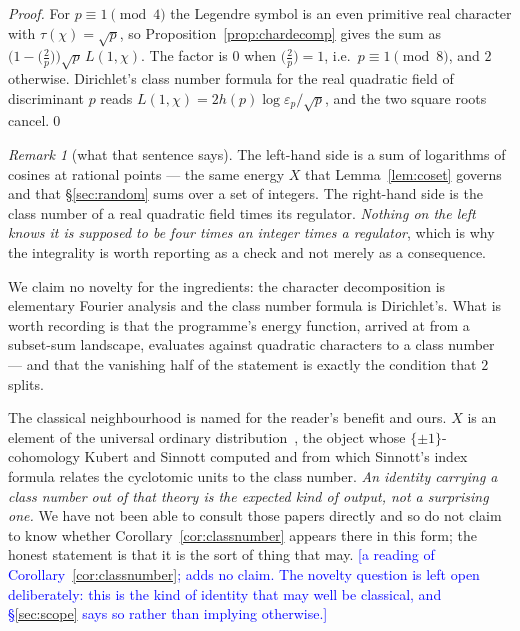 \documentclass[11pt,a4paper]{article}
\theoremstyle{plain}
\theoremstyle{definition}
\theoremstyle{remark}
\newtheorem{remark}[theorem]{Remark}
\newcommand{\STATUS}[1]{\textcolor{blue}{\textsf{[#1]}}}
\begin{document}
\begin{proof}
For $p\equiv1\pmod4$ the Legendre symbol is an even primitive real character with
$\tau(\chi)=\sqrt p$, so Proposition~\ref{prop:chardecomp} gives the sum as
$\bigl(1-\bigl(\tfrac2p\bigr)\bigr)\sqrt p\,L(1,\chi)$. The factor is $0$ when
$\bigl(\tfrac2p\bigr)=1$, i.e.\ $p\equiv1\pmod 8$, and $2$ otherwise. Dirichlet's class number
formula for the real quadratic field of discriminant $p$ reads
$L(1,\chi)=2h(p)\log\varepsilon_p/\sqrt p$, and the two square roots cancel.\qed
\end{proof}

\begin{remark}[what that sentence says]\label{rem:classnumber}
The left-hand side is a sum of logarithms of cosines at rational points --- the same energy
$X$ that Lemma~\ref{lem:coset} governs and that \S\ref{sec:random} sums over a set of integers.
The right-hand side is the class number of a real quadratic field times its regulator.
\emph{Nothing on the left knows it is supposed to be four times an integer times a regulator},
which is why the integrality is worth reporting as a check and not merely as a consequence.

We claim no novelty for the ingredients: the character decomposition is elementary Fourier
analysis and the class number formula is Dirichlet's. What is worth recording is that the
programme's energy function, arrived at from a subset-sum landscape, evaluates against quadratic
characters to a class number --- and that the vanishing half of the statement is exactly the
condition that $2$ splits.

The classical neighbourhood is named for the reader's benefit and ours. $X$ is an element of the
universal ordinary distribution~\cite{KL}, the object whose $\{\pm1\}$-cohomology Kubert and
Sinnott computed and from which Sinnott's index formula relates the cyclotomic units to the class
number. \emph{An identity carrying a class number out of that theory is the expected kind of
output, not a surprising one.} We have not been able to consult those papers directly and so do
not claim to know whether Corollary~\ref{cor:classnumber} appears there in this form; the honest
statement is that it is the sort of thing that may.
\STATUS{a reading of Corollary~\ref{cor:classnumber}; adds no claim. The novelty question is left
open deliberately: this is the kind of identity that may well be classical, and
\S\ref{sec:scope} says so rather than implying otherwise.}
\end{remark}
\end{document}
